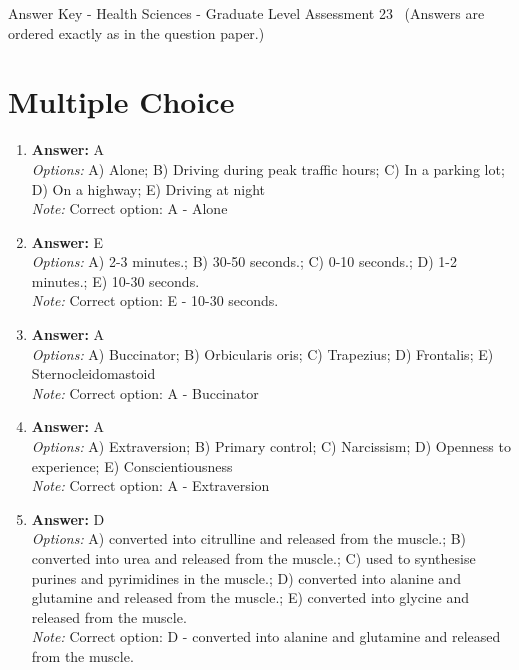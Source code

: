 \documentclass[12pt]{article}
\begin{document}
\begin{center}
Answer Key - Health Sciences - Graduate Level Assessment 23 \
\small (Answers are ordered exactly as in the question paper.)
\end{center}

\section*{Multiple Choice}
\begin{enumerate}[label=\arabic*.]
\item \textbf{Answer:} A
\\ \textit{Options:} A) Alone; B) Driving during peak traffic hours; C) In a parking lot; D) On a highway; E) Driving at night
\\ \textit{Note:} Correct option: A - Alone
\item \textbf{Answer:} E
\\ \textit{Options:} A) 2-3 minutes.; B) 30-50 seconds.; C) 0-10 seconds.; D) 1-2 minutes.; E) 10-30 seconds.
\\ \textit{Note:} Correct option: E - 10-30 seconds.
\item \textbf{Answer:} A
\\ \textit{Options:} A) Buccinator; B) Orbicularis oris; C) Trapezius; D) Frontalis; E) Sternocleidomastoid
\\ \textit{Note:} Correct option: A - Buccinator
\item \textbf{Answer:} A
\\ \textit{Options:} A) Extraversion; B) Primary control; C) Narcissism; D) Openness to experience; E) Conscientiousness
\\ \textit{Note:} Correct option: A - Extraversion
\item \textbf{Answer:} D
\\ \textit{Options:} A) converted into citrulline and released from the muscle.; B) converted into urea and released from the muscle.; C) used to synthesise purines and pyrimidines in the muscle.; D) converted into alanine and glutamine and released from the muscle.; E) converted into glycine and released from the muscle.
\\ \textit{Note:} Correct option: D - converted into alanine and glutamine and released from the muscle.
\end{enumerate}
\end{document}
